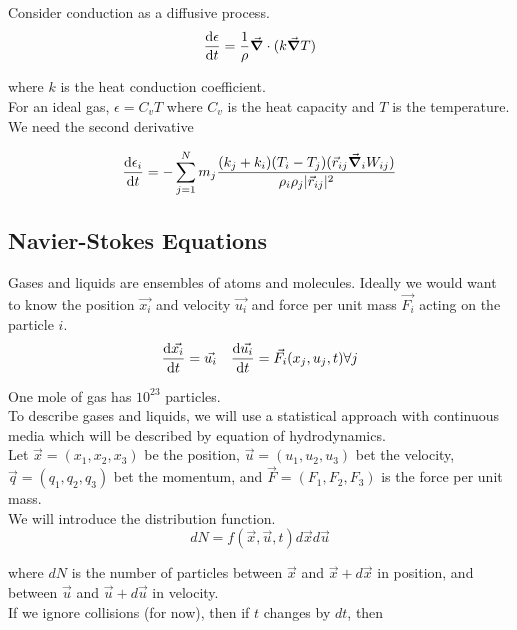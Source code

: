 \documentclass[]{article}
\begin{document}
Consider conduction as a diffusive process.\\

\[\dv{\epsilon}{t} = \frac{1}{\rho} \vec{\grad}\cdot(k\vec{\grad}{T})\]

where $k$ is the heat conduction coefficient.\\

For an ideal gas, $\epsilon = C_v T$ where $C_v$ is the heat capacity and $T$ is the temperature.\\

We need the second derivative

\[\dv{\epsilon_i}{t} = - \sum_{j=1}^N m_j \frac{(k_j+k_i)(T_i - T_j)(\vec{r}_{ij} \vec{\grad}_iW_{ij})}{\rho_i\rho_j |\vec{r}_{ij}|^2}\]

\subsection{Navier-Stokes Equations}\bigbreak

Gases and liquids are ensembles of atoms and molecules. Ideally we would want to know the position $\vec{x_i}$ and velocity $\vec{u_i}$ and force per unit mass $\vec{F_i}$ acting on the particle $i$.\\

\[ \dv{\vec{x_i}}{t} = \vec{u_i} \quad \dv{\vec{u_i}}{t} = \vec{F_i}(x_j, u_j, t) \forall j  \]

One mole of gas has $10^23$ particles.\\

To describe gases and liquids, we will use a statistical approach with continuous media which will be described by equation of hydrodynamics.\\

Let $\vec{x} = (x_1, x_2, x_3)$ be the position, $\vec{u} = (u_1, u_2, u_3)$ bet the velocity, $\vec{q} = (q_1, q_2, q_3)$ bet the momentum, and $\vec{F} = (F_1, F_2, F_3)$ is the force per unit mass.\\

We will introduce the distribution function.\\

\[dN = f(\vec{x}, \vec{u}, t)d\vec{x} d\vec{u}\]

where $dN$ is the number of particles between $\vec{x}$ and $\vec{x} + d\vec{x}$ in position, and between $\vec{u}$ and $\vec{u} + d\vec{u}$ in velocity.\\

If we ignore collisions (for now), then if $t$ changes by $dt$, then 
\end{document}
